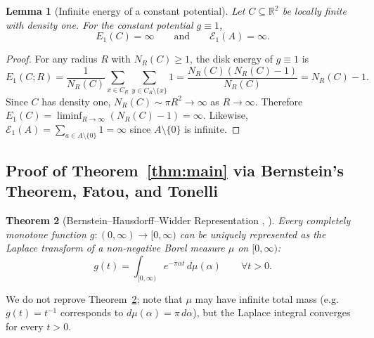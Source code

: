 \documentclass[11pt, a4paper]{article}
\newtheorem{theorem}{Theorem}[section]
\newtheorem{lemma}[theorem]{Lemma}
\theoremstyle{definition}
\theoremstyle{remark}
\newcommand{\R}{\mathbb{R}}
\newcommand{\Ecal}{\mathcal{E}}
\begin{document}
\begin{lemma}[Infinite energy of a constant potential]
\label{lem:energy_one}
Let $C \subseteq \R^2$ be locally finite with density one. For the constant potential $g \equiv 1$,
\[
E_1(C) = \infty \qquad \text{and} \qquad \Ecal_1(A) = \infty.
\]
\end{lemma}

\begin{proof}
For any radius $R$ with $N_R(C) \ge 1$, the disk energy of $g \equiv 1$ is
\[
E_1(C; R) = \frac{1}{N_R(C)} \sum_{x \in C_R} \sum_{y \in C_R \setminus \{x\}} 1 = \frac{N_R(C)\left(N_R(C) - 1\right)}{N_R(C)} = N_R(C) - 1.
\]
Since $C$ has density one, $N_R(C) \sim \pi R^2 \to \infty$ as $R \to \infty$. Therefore $E_1(C) = \liminf_{R \to \infty} (N_R(C) - 1) = \infty$. Likewise, $\Ecal_1(A) = \sum_{a \in A \setminus \{0\}} 1 = \infty$ since $A \setminus \{0\}$ is infinite.
\end{proof}

\subsection{Proof of Theorem~\ref{thm:main} via Bernstein's Theorem, Fatou, and Tonelli}
\label{sec:bernstein}

\begin{theorem}[Bernstein--Hausdorff--Widder Representation , ]
\label{thm:bernstein}
Every completely monotone function $g : (0, \infty) \to [0, \infty)$ can be uniquely represented as the Laplace transform of a non-negative Borel measure $\mu$ on $[0, \infty)$:
\begin{equation}
\label{eq:bernstein}
g(t) = \int_{[0, \infty)} e^{-\pi \alpha t} \, d\mu(\alpha) \qquad \forall t > 0.
\end{equation}
\end{theorem}

\noindent We do not reprove Theorem~\ref{thm:bernstein}; note that $\mu$ may have infinite total mass (e.g.\ $g(t) = t^{-1}$ corresponds to $d\mu(\alpha) = \pi \, d\alpha$), but the Laplace integral converges for every $t > 0$.
\end{document}

